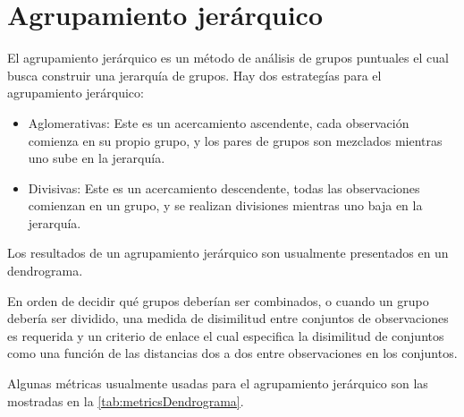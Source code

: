 \section{Agrupamiento jerárquico}
El agrupamiento jerárquico es un método de análisis de grupos puntuales el cual busca construir una jerarquía de grupos.
Hay dos estrategías para el agrupamiento jerárquico:
\begin{itemize}
	\item Aglomerativas: Este es un acercamiento ascendente, cada observación comienza en su propio grupo, y los pares de grupos son mezclados mientras uno sube en la jerarquía.
	\item Divisivas: Este es un acercamiento descendente, todas las observaciones comienzan en un grupo, y se realizan divisiones mientras uno baja en la jerarquía.
\end{itemize}

Los resultados de un agrupamiento jerárquico son usualmente presentados en un dendrograma. 

En orden de decidir qué grupos deberían ser combinados, o cuando un grupo debería ser dividido, una medida de disimilitud entre conjuntos de observaciones es requerida y un criterio de enlace el cual especifica la disimilitud de conjuntos como una función de las distancias dos a dos entre observaciones en los conjuntos.

Algunas métricas usualmente usadas para el agrupamiento jerárquico son las mostradas en la \cref{tab:metricsDendrograma}.


